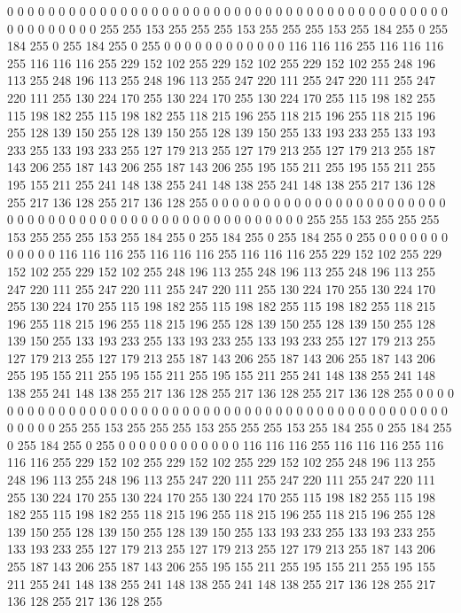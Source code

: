 0 0 0 0 0 0 0 0 0 0 0 0 0 0 0 0 0 0 0 0 0 0 0 0 0 0 0 0 0 0 0 0 0 0 0 0 0 0 0 0 0 0 0 0 0 0 0 0 0 0 0 0 255 255 153 255 255 255 153 255 255 255 153 255
184 255 0 255 184 255 0 255 184 255 0 255 0 0 0 0 0 0 0 0 0 0 0 0 116 116 116 255 116 116 116 255 116 116 116 255 229 152 102 255 229 152 102 255 229 152 102 255 248 196 113 255 248 196 113 255 248 196 113 255 247 220 111 255
247 220 111 255 247 220 111 255 130 224 170 255 130 224 170 255 130 224 170 255 115 198 182 255 115 198 182 255 115 198 182 255 118 215 196 255 118 215 196 255 118 215 196 255 128 139 150 255 128 139 150 255 128 139 150 255 133 193 233 255 133 193 233 255
133 193 233 255 127 179 213 255 127 179 213 255 127 179 213 255 187 143 206 255 187 143 206 255 187 143 206 255 195 155 211 255 195 155 211 255 195 155 211 255 241 148 138 255 241 148 138 255 241 148 138 255 217 136 128 255 217 136 128 255 217 136 128 255
0 0 0 0 0 0 0 0 0 0 0 0 0 0 0 0 0 0 0 0 0 0 0 0 0 0 0 0 0 0 0 0 0 0 0 0 0 0 0 0 0 0 0 0 0 0 0 0 0 0 0 0 255 255 153 255 255 255 153 255 255 255 153 255
184 255 0 255 184 255 0 255 184 255 0 255 0 0 0 0 0 0 0 0 0 0 0 0 116 116 116 255 116 116 116 255 116 116 116 255 229 152 102 255 229 152 102 255 229 152 102 255 248 196 113 255 248 196 113 255 248 196 113 255 247 220 111 255
247 220 111 255 247 220 111 255 130 224 170 255 130 224 170 255 130 224 170 255 115 198 182 255 115 198 182 255 115 198 182 255 118 215 196 255 118 215 196 255 118 215 196 255 128 139 150 255 128 139 150 255 128 139 150 255 133 193 233 255 133 193 233 255
133 193 233 255 127 179 213 255 127 179 213 255 127 179 213 255 187 143 206 255 187 143 206 255 187 143 206 255 195 155 211 255 195 155 211 255 195 155 211 255 241 148 138 255 241 148 138 255 241 148 138 255 217 136 128 255 217 136 128 255 217 136 128 255
0 0 0 0 0 0 0 0 0 0 0 0 0 0 0 0 0 0 0 0 0 0 0 0 0 0 0 0 0 0 0 0 0 0 0 0 0 0 0 0 0 0 0 0 0 0 0 0 0 0 0 0 255 255 153 255 255 255 153 255 255 255 153 255
184 255 0 255 184 255 0 255 184 255 0 255 0 0 0 0 0 0 0 0 0 0 0 0 116 116 116 255 116 116 116 255 116 116 116 255 229 152 102 255 229 152 102 255 229 152 102 255 248 196 113 255 248 196 113 255 248 196 113 255 247 220 111 255
247 220 111 255 247 220 111 255 130 224 170 255 130 224 170 255 130 224 170 255 115 198 182 255 115 198 182 255 115 198 182 255 118 215 196 255 118 215 196 255 118 215 196 255 128 139 150 255 128 139 150 255 128 139 150 255 133 193 233 255 133 193 233 255
133 193 233 255 127 179 213 255 127 179 213 255 127 179 213 255 187 143 206 255 187 143 206 255 187 143 206 255 195 155 211 255 195 155 211 255 195 155 211 255 241 148 138 255 241 148 138 255 241 148 138 255 217 136 128 255 217 136 128 255 217 136 128 255
